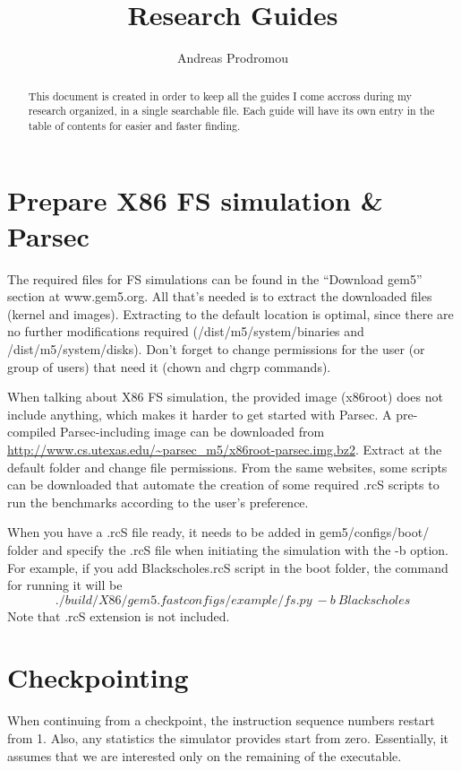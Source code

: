 \documentclass[a4paper,12pt]{article}
\begin{document}
\title{Research Guides}
\author{Andreas Prodromou}
\maketitle
\tableofcontents
\clearpage

\renewcommand{\abstractname}{Introduction -- Explanation}
\begin{abstract}
This document is created in order to keep all the guides I come accross during my research organized, in a single searchable file. Each guide will have its own entry in the table of contents for easier and faster finding.
\end{abstract}

\section{Prepare X86 FS simulation \& Parsec}
The required files for FS simulations can be found in the ``Download gem5'' section at www.gem5.org. All that's needed is to extract the downloaded files (kernel and images). Extracting to the default location is optimal, since there are no further modifications required (/dist/m5/system/binaries and /dist/m5/system/disks). Don't forget to change permissions for the user (or group of users) that need it (chown and chgrp commands). 

When talking about X86 FS simulation, the provided image (x86root) does not include anything, which makes it harder to get started with Parsec. A pre-compiled Parsec-including image can be downloaded from \url{http://www.cs.utexas.edu/~parsec_m5/x86root-parsec.img.bz2}. Extract at the default folder and change file permissions. From the same websites, some scripts can be downloaded that automate the creation of some required .rcS scripts to run the benchmarks according to the user's preference.

When you have a .rcS file ready, it needs to be added in gem5/configs/boot/ folder and specify the .rcS file when initiating the simulation with the -b option. For example, if you add Blackscholes.rcS script in the boot folder, the command for running it will be $$./build/X86/gem5.fast configs/example/fs.py\ -b\ Blackscholes$$ Note that .rcS extension is not included.

\section{Checkpointing}

When continuing from a checkpoint, the instruction sequence numbers restart from 1. Also, any statistics the simulator provides start from zero. Essentially, it assumes that we are interested only on the remaining of the executable.
\end{document}
